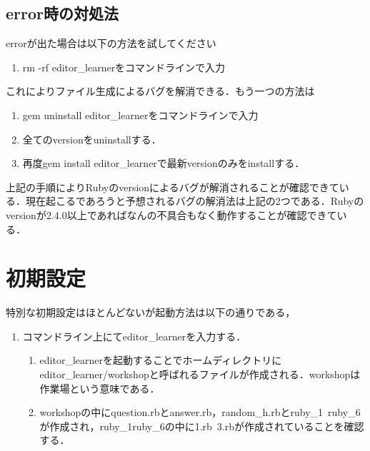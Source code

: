 \subsection{error時の対処法}\label{errorux6642ux306eux5bfeux51e6ux6cd5}

errorが出た場合は以下の方法を試してください

\begin{enumerate}
\def\labelenumi{\arabic{enumi}.}
\tightlist
\item
  rm -rf editor\_learnerをコマンドラインで入力
\end{enumerate}これによりファイル生成によるバグを解消できる．もう一つの方法は

\begin{enumerate}
\def\labelenumi{\arabic{enumi}.}
\tightlist
\item
  gem uninstall editor\_learnerをコマンドラインで入力
\item
  全てのversionをuninstallする．
\item
  再度gem install editor\_learnerで最新versionのみをinstallする．
\end{enumerate}
上記の手順によりRubyのversionによるバグが解消されることが確認できている．現在起こるであろうと予想されるバグの解消法は上記の2つである．Rubyのversionが2.4.0以上であればなんの不具合もなく動作することが確認できている．

    \section{初期設定}\label{ux521dux671fux8a2dux5b9a}

    特別な初期設定はほとんどないが起動方法は以下の通りである，

\begin{enumerate}
\def\labelenumi{\arabic{enumi}.}
\tightlist
\item
  コマンドライン上にてeditor\_learnerを入力する．

  \begin{enumerate}
  \def\labelenumii{\arabic{enumii}.}
  \setcounter{enumii}{1}
  \tightlist
  \item
    editor\_learnerを起動することでホームディレクトリにeditor\_learner/workshopと呼ばれるファイルが作成される．workshopは作業場という意味である．
  \item
    workshopの中にquestion.rbとanswer.rb，random\_h.rbとruby\_1~ruby\_6が作成され，ruby\_1ruby\_6の中に1.rb~3.rbが作成されていることを確認する．
  \end{enumerate}
\end{enumerate}

